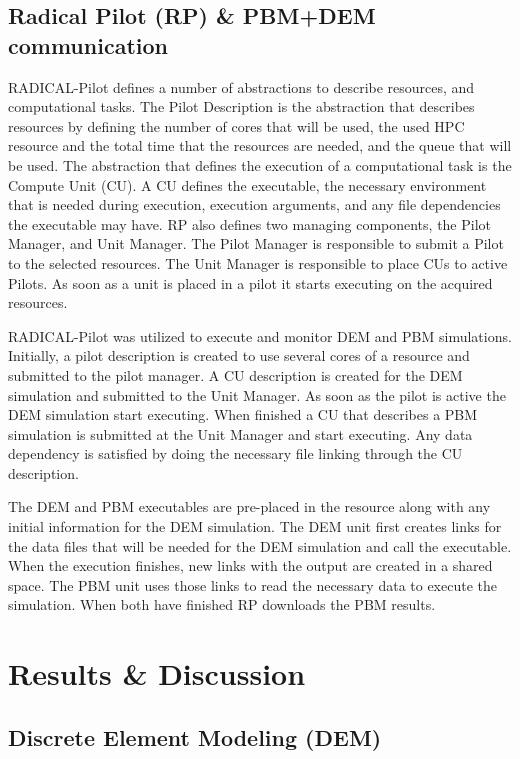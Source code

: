 \documentclass[preprint,11pt,authoryear]{elsarticle}
\begin{document}
\subsection{Radical Pilot (RP) \& PBM+DEM communication}
\label{sec:RPandCommunications}
RADICAL-Pilot defines a number of abstractions to describe resources, and computational 
tasks. The Pilot Description is the abstraction that describes resources by defining the 
number of cores that will be used, the used HPC resource and the total time that the 
resources are needed, and the queue that will be used. The abstraction that defines the 
execution of a computational task is the Compute Unit (CU). A CU defines the executable, 
the necessary environment that is needed during execution, execution arguments, and any 
file dependencies the executable may have. RP also defines two managing components, the
Pilot Manager, and Unit Manager. The Pilot Manager is responsible to submit a Pilot to the
selected resources. The Unit Manager is responsible to place CUs to active Pilots. As soon as
a unit is placed in a pilot it starts executing on the acquired resources.

RADICAL-Pilot was utilized to execute and monitor DEM and PBM simulations. Initially, a pilot
description is created to use several cores of a resource and submitted to the pilot manager. A
CU description is created for the DEM simulation and submitted to the Unit Manager. As soon as the
pilot is active the DEM simulation start executing. When finished a CU that describes a PBM 
simulation is submitted at the Unit Manager and start executing. Any data dependency is satisfied 
by doing the necessary file linking through the CU description.

The DEM and PBM executables are pre-placed in the resource along with any initial 
information for the DEM simulation. The DEM unit first creates links for the data files that will 
be needed for the DEM simulation and call the executable. When the execution finishes, new links 
with the output are created in a shared space. The PBM unit uses those links to read the necessary 
data to execute the simulation. When both have finished RP downloads the PBM results.



\section{Results \& Discussion}
\label{sec:Results}
\subsection{Discrete Element Modeling (DEM)}
\end{document}
